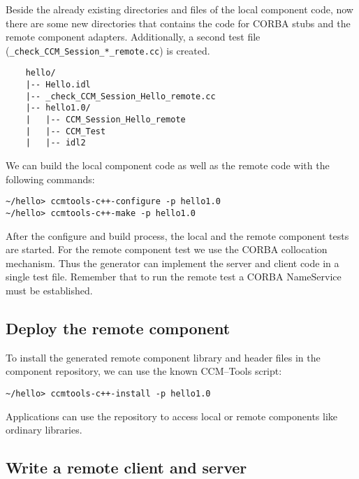 \noindent
Beside the already existing directories and files of the local component code, 
now there are some new directories that contains the code for CORBA stubs and 
the remote component adapters.
Additionally, a second test file ({\tt \_check\_CCM\_Session\_*\_remote.cc}) is
created.

\begin{small}
\begin{verbatim}
    hello/
    |-- Hello.idl
    |-- _check_CCM_Session_Hello_remote.cc
    |-- hello1.0/
    |   |-- CCM_Session_Hello_remote
    |   |-- CCM_Test
    |   |-- idl2
\end{verbatim}
\end{small}

\noindent
We can build the local component code as well as the remote code with the
following commands:
\begin{small}
\begin{verbatim}
~/hello> ccmtools-c++-configure -p hello1.0
~/hello> ccmtools-c++-make -p hello1.0
\end{verbatim}
\end{small}
After the configure and build process, the local and the remote component tests
are started.
For the remote component test we use the CORBA collocation mechanism. Thus the 
generator  can implement the server and client code in a single test file.
Remember that to run the remote test a CORBA NameService must be established.


\subsection{Deploy the remote component}

To install the generated remote component library and header files in the
component repository, we can use the known CCM--Tools script:
\begin{verbatim}
~/hello> ccmtools-c++-install -p hello1.0
\end{verbatim}

\noindent
Applications can use the repository to access local or remote components 
like ordinary libraries.


\subsection{Write a remote client and server}


